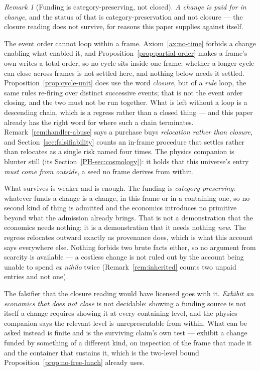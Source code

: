\documentclass[11pt,a4paper]{article}
\theoremstyle{remark}\newtheorem{remark}[definition]{Remark}
\begin{document}
\begin{remark}[Funding is category-preserving, not closed]\label{rem:funding-category}
\emph{A change is paid for in change}, and the status of that is category-preservation and not
closure --- the closure reading does not survive, for reasons this paper supplies against itself.

The event order cannot loop within a frame. Axiom~\ref{ax:no-time} forbids a change enabling what
enabled it, and Proposition~\ref{prop:partial-order} makes a frame's own writes a total order, so no
cycle sits inside one frame; whether a longer cycle can close across frames is not settled here, and
nothing below needs it settled. Proposition~\ref{prop:cycle-unit} does use the word
\emph{closure}, but of a \emph{rule} loop, the same rules re-firing over distinct successive events;
that is not the event order closing, and the two must not be run together. What is left
without a loop is a descending chain, which is a regress rather than a closed thing --- and this paper
already has the right word for where such a chain terminates. Remark~\ref{rem:handler-abuse} says a
purchase buys \emph{relocation rather than closure}, and Section~\ref{sec:falsifiability} counts an
in-frame procedure that settles rather than relocates as a single risk named four times. The physics
companion is blunter still (its Section~\ref{PH-sec:cosmology}): it holds that this universe's entry \emph{must come from outside}, a seed
no frame derives from within.

What survives is weaker and is enough. The funding is
\emph{category-preserving}: whatever funds a change is a change, in this frame or in a containing one,
so no second kind of thing is admitted and the economics introduces no primitive beyond what the
admission already brings. That is not a demonstration that the economics needs nothing; it is a
demonstration that it needs nothing \emph{new}. The regress relocates outward exactly as provenance
does, which is what this account says everywhere else. Nothing forbids two brute facts either, so no
argument from scarcity is available --- a costless change is not ruled out by the account being unable
to spend \emph{ex nihilo} twice (Remark~\ref{rem:inherited} counts two unpaid entries and not one).

The falsifier that the closure reading would have licensed goes with it. \emph{Exhibit an economics
that does not close} is not decidable: showing a
funding source is not itself a change requires showing it at every containing level, and the physics
companion says the relevant level is unrepresentable from within. What can be asked instead is finite
and is the surviving claim's own test --- exhibit a change funded by something of a different kind, on
inspection of the frame that made it and the container that sustains it, which is the two-level bound
Proposition~\ref{prop:no-free-lunch} already uses.
\end{remark}
\end{document}
